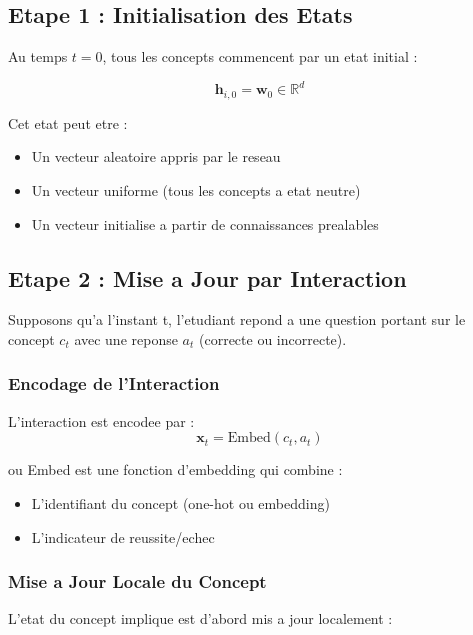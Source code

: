 \documentclass[11pt, a4paper]{article}
\begin{document}
\subsection{Etape 1 : Initialisation des Etats}

Au temps $t=0$, tous les concepts commencent par un etat initial :

\begin{equation}
    \mathbf{h}_{i,0} = \mathbf{w}_0 \in \mathbb{R}^d
\end{equation}

Cet etat peut etre :
\begin{itemize}
    \item Un vecteur aleatoire appris par le reseau
    \item Un vecteur uniforme (tous les concepts a etat neutre)
    \item Un vecteur initialise a partir de connaissances prealables
\end{itemize}

\subsection{Etape 2 : Mise a Jour par Interaction}

Supposons qu'a l'instant t, l'etudiant repond a une question portant sur le concept $c_t$ avec une reponse $a_t$ (correcte ou incorrecte).

\subsubsection{Encodage de l'Interaction}

L'interaction est encodee par :
\begin{equation}
    \mathbf{x}_t = \text{Embed}(c_t, a_t)
\end{equation}

ou Embed est une fonction d'embedding qui combine :
\begin{itemize}
    \item L'identifiant du concept (one-hot ou embedding)
    \item L'indicateur de reussite/echec
\end{itemize}

\subsubsection{Mise a Jour Locale du Concept}

L'etat du concept implique est d'abord mis a jour localement :
\end{document}
